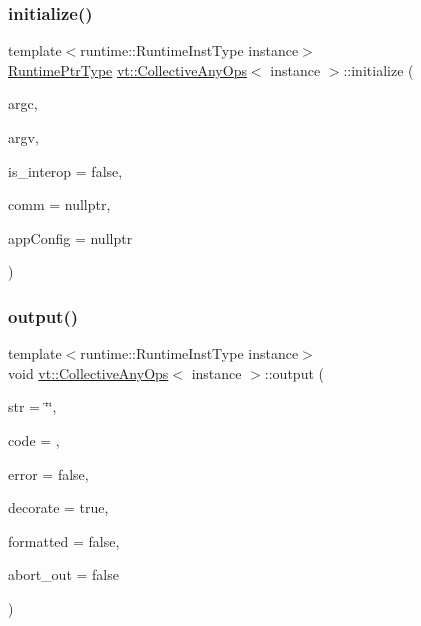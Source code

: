 \mbox{\label{structvt_1_1_collective_any_ops_aadcc1fe5e20336eebcd28d5800700cc4}} 
\subsubsection{\texorpdfstring{initialize()}{initialize()}}
{\footnotesize\ttfamily template$<$runtime\+::\+Runtime\+Inst\+Type instance$>$ \\
\hyperlink{namespacevt_a0ce60e0299d8fa32223b3b9ffa0af466}{Runtime\+Ptr\+Type} \hyperlink{structvt_1_1_collective_any_ops}{vt\+::\+Collective\+Any\+Ops}$<$ instance $>$\+::initialize (\begin{DoxyParamCaption}\item[{int \&}]{argc,  }\item[{char $\ast$$\ast$\&}]{argv,  }\item[{bool}]{is\+\_\+interop = {\ttfamily false},  }\item[{M\+P\+I\+\_\+\+Comm $\ast$}]{comm = {\ttfamily nullptr},  }\item[{\hyperlink{structvt_1_1arguments_1_1_app_config}{arguments\+::\+App\+Config} const $\ast$}]{app\+Config = {\ttfamily nullptr} }\end{DoxyParamCaption})\hspace{0.3cm}{\ttfamily [static]}}

\mbox{\label{structvt_1_1_collective_any_ops_a5ae4676659166ab1e1ac7334776d58c3}} 
\subsubsection{\texorpdfstring{output()}{output()}}
{\footnotesize\ttfamily template$<$runtime\+::\+Runtime\+Inst\+Type instance$>$ \\
void \hyperlink{structvt_1_1_collective_any_ops}{vt\+::\+Collective\+Any\+Ops}$<$ instance $>$\+::output (\begin{DoxyParamCaption}\item[{std\+::string const}]{str = {\ttfamily \char`\"{}\char`\"{}},  }\item[{\hyperlink{namespacevt_a793764d753923abc3d32929870beb485}{Error\+Code\+Type} const}]{code = {},  }\item[{bool}]{error = {\ttfamily false},  }\item[{bool}]{decorate = {\ttfamily true},  }\item[{bool}]{formatted = {\ttfamily false},  }\item[{bool}]{abort\+\_\+out = {\ttfamily false} }\end{DoxyParamCaption})\hspace{0.3cm}{\ttfamily [static]}}

